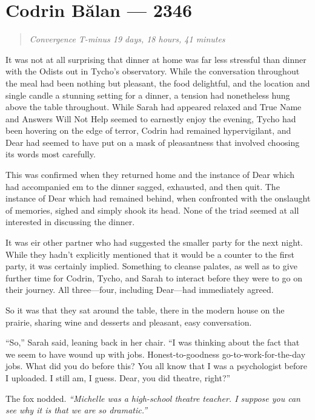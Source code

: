 \hypertarget{codrin-bux103lan-2346}{%
\chapter{Codrin Bălan — 2346}}

\begin{quote}
\emph{Convergence T-minus 19 days, 18 hours, 41 minutes}
\end{quote}

\noindent It was not at all surprising that dinner at home was far less stressful than dinner with the Odists out in Tycho's observatory. While the conversation throughout the meal had been nothing but pleasant, the food delightful, and the location and single candle a stunning setting for a dinner, a tension had nonetheless hung above the table throughout. While Sarah had appeared relaxed and True Name and Answers Will Not Help seemed to earnestly enjoy the evening, Tycho had been hovering on the edge of terror, Codrin had remained hypervigilant, and Dear had seemed to have put on a mask of pleasantness that involved choosing its words most carefully.

This was confirmed when they returned home and the instance of Dear which had accompanied em to the dinner sagged, exhausted, and then quit. The instance of Dear which had remained behind, when confronted with the onslaught of memories, sighed and simply shook its head. None of the triad seemed at all interested in discussing the dinner.

It was eir other partner who had suggested the smaller party for the next night. While they hadn't explicitly mentioned that it would be a counter to the first party, it was certainly implied. Something to cleanse palates, as well as to give further time for Codrin, Tycho, and Sarah to interact before they were to go on their journey. All three—four, including Dear—had immediately agreed.

So it was that they sat around the table, there in the modern house on the prairie, sharing wine and desserts and pleasant, easy conversation.

``So,'' Sarah said, leaning back in her chair. ``I was thinking about the fact that we seem to have wound up with jobs. Honest-to-goodness go-to-work-for-the-day jobs. What did you do before this? You all know that I was a psychologist before I uploaded. I still am, I guess. Dear, you did theatre, right?''

The fox nodded. \emph{``Michelle was a high-school theatre teacher. I suppose you can see why it is that we are so dramatic.''}

